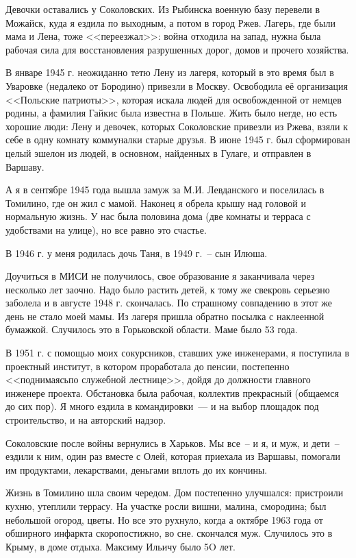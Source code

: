 Девочки  оставались  у  Соколовских.  Из  Рыбинска  военную  базу перевели  в 
Можайск, куда я ездила по выходным, а потом в город Ржев. Лагерь, где были мама 
и Лена, тоже  <<переезжал>>: война  отходила  на запад, нужна была рабочая сила для 
восстановления  разрушенных дорог,  домов  и  прочего  хозяйства.

В январе  1945 г.  неожиданно  тетю  Лену  из  лагеря,  который  в это  время был 
в Уваровке (недалеко от Бородино) привезли  в Москву.  Освободила её организация 
<<Польские патриоты>>, которая искала людей для освобожденной от немцев родины, 
а фамилия  Гайкис  была известна  в  Польше. Жить  было негде, но есть  хорошие 
люди: Лену и девочек, которых  Соколовские привезли  из Ржева, взяли  к  себе  в 
одну комнату коммуналки  старые друзья.  В июне  1945 г. был сформирован  целый 
эшелон  из  людей, в основном, найденных в Гулаге, и отправлен в Варшаву.

А  я в сентябре  1945 года  вышла  замуж  за  М.И. Левданского  и  поселилась  в 
Томилино, где он жил с мамой. Наконец я обрела крышу над головой и нормальную 
жизнь. У нас  была половина дома (две комнаты и терраса  с  удобствами на улице), 
но все равно  это счастье.

В  1946 г. у меня родилась дочь Таня,  в  1949 г.~-- сын Илюша.

Доучиться  в  МИСИ  не  получилось,  свое  образование  я  заканчивала  через 
несколько  лет  заочно.  Надо  было  растить  детей,  к тому  же  свекровь  серьезно 
заболела и в августе  1948 г. скончалась. По страшному совпадению  в этот  же  день 
не  стало  моей  мамы.  Из  лагеря пришла  обратно посылка с наклеенной бумажкой. 
Случилось  это в Горьковской области. Маме было 53 года.

В  1951  г. с помощью моих сокурсников, ставших уже инженерами, я  поступила 
в  проектный институт, в котором проработала до пенсии, постепенно  <<поднимаясьпо  служебной  лестнице>>,  дойдя  до  должности  главного  инженере  проекта.
Обстановка  была рабочая, коллектив прекрасный (общаемся до сих пор).  Я  много 
ездила в командировки~--- и  на выбор площадок под строительство, и  на  авторский 
надзор.

Соколовские  после  войны  вернулись  в Харьков. Мы все~-- и я, и муж, и  дети~--
ездили к ним, один раз вместе с Олей,  которая приехала из Варшавы, помогали  им 
продуктами, лекарствами, деньгами вплоть до их кончины.

Жизнь в Томилино шла своим чередом. Дом постепенно улучшался:  пристроили 
кухню,  утеплили  террасу. На  участке  росли  вишни,  малина, смородина; был 
небольшой  огород,  цветы.  Но все  это  рухнуло,  когда  а  октябре  1963 года  от 
обширного  инфаркта  скоропостижно,  во сне. скончался  муж.  Случилось  это  в 
Крыму, в доме отдыха. Максиму Ильичу было 5O лет.

